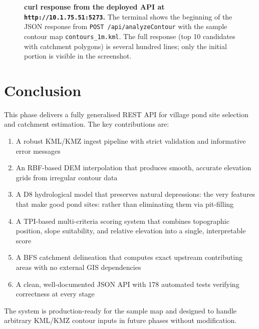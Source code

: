\documentclass[12pt,a4paper]{article}
\begin{document}
\begin{figure}[H]
    \centering
    \caption{\textbf{curl response from the deployed API at \texttt{http://10.1.75.51:5273}.}
    The terminal shows the beginning of the JSON response from \texttt{POST /api/analyzeContour}
    with the sample contour map \texttt{contours\_1m.kml}.
    The full response (top 10 candidates with catchment polygons) is several hundred lines;
    only the initial portion is visible in the screenshot.}
    \label{fig:curl}
\end{figure}

\section{Conclusion}

This phase delivers a fully generalised REST API for village pond site selection and catchment estimation. The key contributions are:

\begin{enumerate}
\item A robust KML/KMZ ingest pipeline with strict validation and informative error messages
\item An RBF-based DEM interpolation that produces smooth, accurate elevation grids from irregular contour data
\item A D8 hydrological model that preserves natural depressions: the very features that make good pond sites: rather than eliminating them via pit-filling
\item A TPI-based multi-criteria scoring system that combines topographic position, slope suitability, and relative elevation into a single, interpretable score
\item A BFS catchment delineation that computes exact upstream contributing areas with no external GIS dependencies
\item A clean, well-documented JSON API with 178 automated tests verifying correctness at every stage
\end{enumerate}

The system is production-ready for the sample map and designed to handle arbitrary KML/KMZ contour inputs in future phases without modification.
\end{document}
